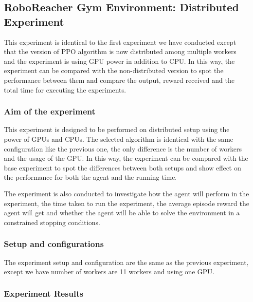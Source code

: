 
\subsection{RoboReacher Gym Environment: Distributed Experiment}

This experiment is identical to the first experiment we have conducted except that the version of PPO algorithm is now distributed among multiple workers and the experiment is using GPU power in addition to CPU. In this way, the experiment can be compared with the non-distributed version to spot the performance between them and compare the output, reward received and the total time for executing the experiments. 

\subsubsection{Aim of the experiment}

This experiment is designed to be performed on distributed setup using the power of GPUs and CPUs. The selected algorithm is identical with the same configuration like the previous one, the only difference is the number of workers and the usage of the GPU. In this way, the experiment can be compared with the base experiment to spot the differences between both setups and show effect on the performance for both the agent and the running time.

The experiment is also conducted to investigate how the agent will perform in the experiment, the time taken to run the experiment, the average episode reward the agent will get and whether the agent will be able to solve the environment in a constrained stopping conditions.

\subsubsection{Setup and configurations}

The experiment setup and configuration are the same as the previous experiment, except we have number of workers are 11 workers and using one GPU.

\subsubsection{Experiment Results}

